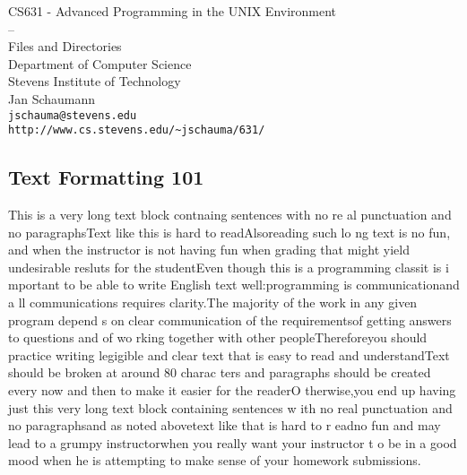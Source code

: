 \documentclass[xga]{xdvislides}
\begin{document}
\setfontphv

\lhead{\slidetitle}
\cfoot{\relax}
\rfoot{\Gray{\today}}

\vspace*{\fill}
\begin{center}
	\Hugesize
		CS631 - Advanced Programming in the UNIX Environment\\
		-- \\
		Files and Directories
	\hspace*{5mm}\blueline\\ [1em]
	\Normalsize
		Department of Computer Science\\
		Stevens Institute of Technology\\
		Jan Schaumann\\
		\verb+jschauma@stevens.edu+\\
		\verb+http://www.cs.stevens.edu/~jschauma/631/+
\end{center}
\vspace*{\fill}

\subsection{Text Formatting 101}

This is a very long text block contnaing sentences with no re al
punctuation and no paragraphsText like this is hard to readAlsoreading
such lo ng text is no fun, and when the instructor is not having fun when
grading that might yield undesirable resluts for the studentEven though
this is a programming classit is i mportant to be able to write English
text well:programming is communicationand a ll communications requires
clarity.The majority of the work in any given program depend s on clear
communication of the requirementsof getting answers to questions and of wo
rking together with other peopleThereforeyou should practice writing
legigible and clear text that is easy to read and understandText should be
broken at around 80 charac ters and paragraphs should be created every now
and then to make it easier for the readerO therwise,you end up having just
this very long text block containing sentences w ith no real punctuation
and no paragraphsand as noted abovetext like that is hard to r eadno fun
and may lead to a grumpy instructorwhen you really want your instructor t
o be in a good mood when he is attempting to make sense of your homework
submissions.
\end{document}

